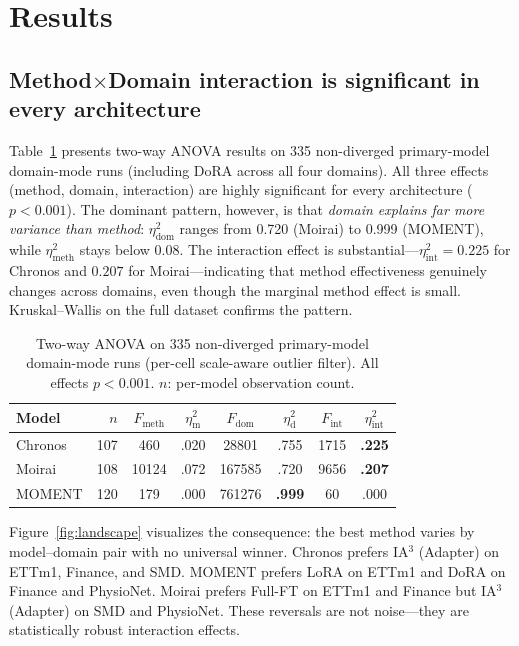 \documentclass{article}
\begin{document}
\section{Results}

\subsection{Method$\times$Domain interaction is significant in every architecture}
\label{sec:interaction}

Table~\ref{tab:anova-results} presents two-way ANOVA results on 335 non-diverged primary-model domain-mode runs (including DoRA across all four domains). All three effects (method, domain, interaction) are highly significant for every architecture ($p < 0.001$). The dominant pattern, however, is that \emph{domain explains far more variance than method}: $\eta^2_{\text{dom}}$ ranges from 0.720 (Moirai) to 0.999 (MOMENT), while $\eta^2_{\text{meth}}$ stays below 0.08. The interaction effect is substantial---$\eta^2_{\text{int}}{=}0.225$ for Chronos and $0.207$ for Moirai---indicating that method effectiveness genuinely changes across domains, even though the marginal method effect is small. Kruskal--Wallis on the full dataset confirms the pattern.

\begin{table}[t]
\centering
\caption{Two-way ANOVA on 335 non-diverged primary-model domain-mode runs (per-cell scale-aware outlier filter). All effects $p < 0.001$. $n$: per-model observation count.}
\label{tab:anova-results}
\small
\begin{tabular}{lrcccccc}
\toprule
Model & $n$ & $F_{\text{meth}}$ & $\eta^2_{\text{m}}$ & $F_{\text{dom}}$ & $\eta^2_{\text{d}}$ & $F_{\text{int}}$ & $\eta^2_{\text{int}}$ \\
\midrule
Chronos & 107 & 460 & .020 & 28801 & .755 & 1715 & \textbf{.225} \\
Moirai  & 108 & 10124 & .072 & 167585 & .720 & 9656 & \textbf{.207} \\
MOMENT  & 120 & 179 & .000 & 761276 & \textbf{.999} & 60 & .000 \\
\bottomrule
\end{tabular}
\end{table}

Figure~\ref{fig:landscape} visualizes the consequence: the best method varies by model--domain pair with no universal winner. Chronos prefers IA$^3$ (Adapter) on ETTm1, Finance, and SMD. MOMENT prefers LoRA on ETTm1 and DoRA on Finance and PhysioNet. Moirai prefers Full-FT on ETTm1 and Finance but IA$^3$ (Adapter) on SMD and PhysioNet. These reversals are not noise---they are statistically robust interaction effects.
\end{document}
